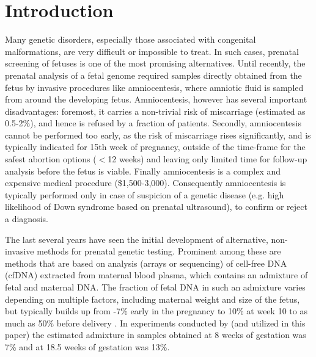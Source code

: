 \section{Introduction}

Many genetic disorders, especially those associated with congenital malformations, are very difficult or impossible to treat. In such cases, prenatal screening of fetuses is one of the most promising alternatives. 
Until recently, the prenatal analysis of a fetal genome required samples directly obtained from the fetus by invasive procedures like amniocentesis, where amniotic fluid is sampled from around the developing fetus.
Amniocentesis, however has several important disadvantages: foremost, it carries a non-trivial risk of miscarriage (estimated as 0.5-2\%), and hence is refused by a fraction of patients. Secondly, amniocentesis cannot be performed too early, as the risk of miscarriage rises significantly, and is typically indicated for 15th week of pregnancy, outside of the time-frame for the safest abortion options ($<$12 weeks) and leaving only limited time for follow-up analysis before the fetus is viable. Finally amniocentesis is a complex and expensive medical procedure (\$1,500-3,000). Consequently amniocentesis is typically performed only in case of suspicion of a genetic disease (e.g. high likelihood of Down syndrome based on prenatal ultrasound), to confirm or reject a diagnosis. 

The last several years have seen the initial development of alternative, non-invasive methods for prenatal genetic testing. Prominent among these are methods that are based on analysis (arrays or sequencing) of  cell-free DNA (cfDNA) extracted from maternal blood plasma, which contains an admixture of fetal and maternal DNA. The fraction of fetal DNA in such an admixture varies depending on multiple factors, including maternal weight and size of the fetus, but typically builds up from -7\% early in the pregnancy to 10\% at week 10 \cite{wang2013} to as much as 50\% before delivery \cite{wang2013, fan2012}. In experiments conducted by \cite{kitzman2012} (and utilized in this paper) the estimated admixture in samples obtained at 8 weeks of gestation was 7\% and at 18.5 weeks of gestation was 13\%. 

